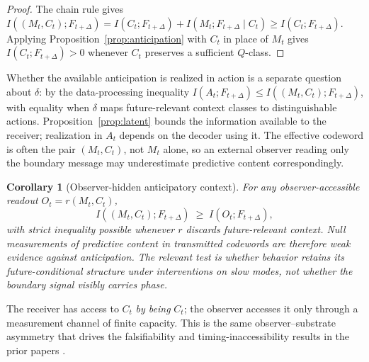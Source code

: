\documentclass[12pt]{article}
\newtheorem{corollary}{Corollary}
\theoremstyle{definition}
\newcommand{\I}{I}
\begin{document}
\begin{proof}
The chain rule gives $\I((M_t,C_t);F_{t+\Delta})=\I(C_t;F_{t+\Delta})+\I(M_t;F_{t+\Delta}\mid C_t)\geq\I(C_t;F_{t+\Delta})$. Applying Proposition~\ref{prop:anticipation} with $C_t$ in place of $M_t$ gives $\I(C_t;F_{t+\Delta})>0$ whenever $C_t$ preserves a sufficient $Q$-class.
\end{proof}

Whether the available anticipation is realized in action is a separate question about $\delta$: by the data-processing inequality $\I(A_t;F_{t+\Delta})\leq\I((M_t,C_t);F_{t+\Delta})$, with equality when $\delta$ maps future-relevant context classes to distinguishable actions. Proposition~\ref{prop:latent} bounds the information available to the receiver; realization in $A_t$ depends on the decoder using it. The effective codeword is often the pair $(M_t,C_t)$, not $M_t$ alone, so an external observer reading only the boundary message may underestimate predictive content correspondingly.

\begin{corollary}[Observer-hidden anticipatory context]
\label{cor:hidden}
For any observer-accessible readout $O_t=r(M_t,C_t)$,
\[
\I((M_t,C_t);F_{t+\Delta}) \;\geq\; \I(O_t;F_{t+\Delta}),
\]
with strict inequality possible whenever $r$ discards future-relevant context. Null measurements of predictive content in transmitted codewords are therefore weak evidence against anticipation. The relevant test is whether \emph{behavior} retains its future-conditional structure under interventions on slow modes, not whether the boundary signal visibly carries phase.
\end{corollary}

The receiver has access to $C_t$ \emph{by being} $C_t$; the observer accesses it only through a measurement channel of finite capacity. This is the same observer--substrate asymmetry that drives the falsifiability and timing-inaccessibility results in the prior papers \citep{todd2025falsifiability,todd2025maxwell}.
\end{document}
